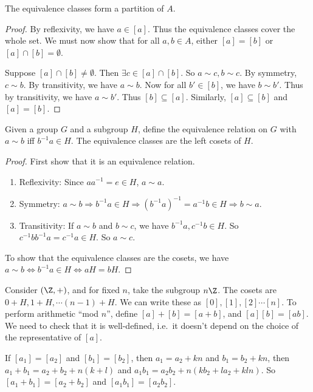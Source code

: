 \documentclass[a4paper]{article}
\begin{document}
\begin{prop}
  The equivalence classes form a partition of $A$.
\end{prop}

\begin{proof}
  By reflexivity, we have $a\in [a]$. Thus the equivalence classes cover the whole set. We must now show that for all $a, b\in A$, either $[a] = [b]$ or $[a]\cap [b]=\emptyset$.

  Suppose $[a]\cap[b]\not=\emptyset$. Then $\exists c\in [a]\cap[b]$. So $a\sim c, b\sim c$. By symmetry, $c\sim b$. By transitivity, we have $a\sim b$. Now for all $b'\in [b]$, we have $b\sim b'$. Thus by transitivity, we have $a\sim b'$. Thus $[b]\subseteq[a]$. Similarly, $[a]\subseteq[b]$ and $[a] = [b]$.
\end{proof}

\begin{lemma}
  Given a group $G$ and a subgroup $H$, define the equivalence relation on $G$ with $a\sim b$ iff $b^{-1}a\in H$. The equivalence classes are the left cosets of $H$.
\end{lemma}

\begin{proof}
  First show that it is an equivalence relation.
  \begin{enumerate}
    \item Reflexivity: Since $aa^{-1} = e\in H$, $a\sim a$.
    \item Symmetry: $a\sim b\Rightarrow b^{-1}a\in H \Rightarrow (b^{-1}a)^{-1} = a^{-1}b\in H\Rightarrow b\sim a$.
    \item Transitivity: If $a\sim b$ and $b\sim c$, we have $b^{-1}a, c^{-1}b\in H$. So $c^{-1}bb^{-1}a = c^{-1}a\in H$. So $a\sim c$.
  \end{enumerate}
  To show that the equivalence classes are the cosets, we have $a\sim b\Leftrightarrow b^{-1}a\in H \Leftrightarrow aH = bH$.
\end{proof}

\begin{eg}
  Consider $(\Z, +)$, and for fixed $n$, take the subgroup $n\Z$. The cosets are $0+ H, 1 + H, \cdots (n - 1)+H$. We can write these as $[0], [1], [2] \cdots [n]$. To perform arithmetic ``mod $n$'', define $[a] + [b] = [a + b]$, and $[a][b] = [ab]$. We need to check that it is well-defined, i.e.\ it doesn't depend on the choice of the representative of $[a]$.

  If $[a_1] = [a_2]$ and $[b_1] = [b_2]$, then $a_1 = a_2 + kn$ and $b_1 = b_2 + kn$, then $a_1 + b_1 = a_2 + b_2 + n(k + l)$ and $a_1b_1 = a_2b_2 + n(kb_2 +la_2 + kln)$. So $[a_1 + b_1] = [a_2 + b_2]$ and $[a_1b_1] = [a_2b_2]$.
\end{eg}
\end{document}
